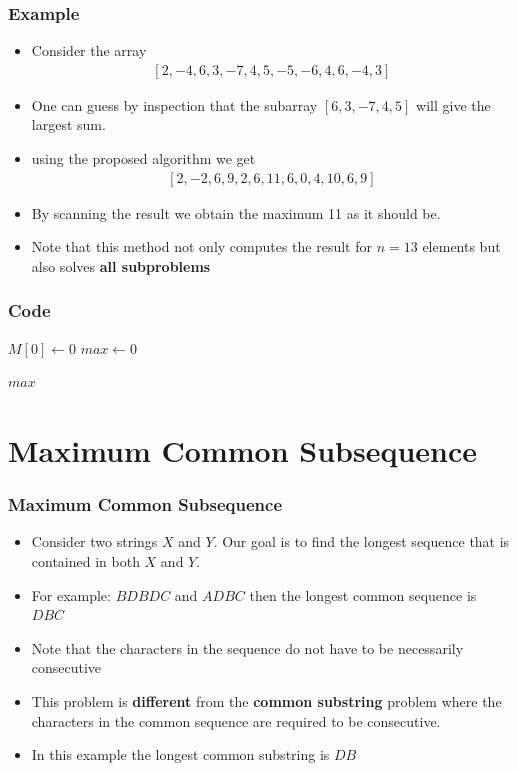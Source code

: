 \documentclass{beamer}
\begin{document}
\begin{frame}
  \frametitle{Example}
  \begin{itemize}
  \item Consider the array
    \begin{align*}
      \left[2,-4,6,3,-7,4,5,-5,-6,4,6,-4,3 \right]
    \end{align*}
\item One can guess by inspection that the subarray $\left[6,3,-7,4,5 \right]$ will give the largest sum.
\item using the proposed algorithm we get
  \begin{align*}
    \left[2,-2,6,9,2,6,11,6,0,4,10,6,9 \right]
  \end{align*}
\item By scanning the result we obtain the maximum 11 as it should be.
\item Note that this method not only computes the result for $n=13$ elements but also solves \textbf{all subproblems}
  \end{itemize}
\end{frame}

\begin{frame}
  \frametitle{Code}
\begin{algorithm}[H]
 
  \DontPrintSemicolon
  \BlankLine

$M[0]\gets 0$\;
$max\gets 0$\;

\Return $max$\;  
\end{algorithm}
    
\end{frame}

\section{Maximum Common Subsequence}
\begin{frame}
  \frametitle{Maximum Common Subsequence}
  \begin{itemize}
  \item Consider two strings $X$ and $Y$. Our goal is to find the longest sequence that is contained in both $X$ and $Y$.
  
  \item For example: $BDBDC$ and $ADBC$ then the longest common sequence is $DBC$
  \item Note that the characters in the sequence do not have to be necessarily consecutive
  \item This problem is \textbf{different} from the \textbf{common substring} problem where the characters in the common sequence are required to be consecutive.
  \item In this example the longest common substring is $DB$
  \end{itemize}
\end{frame}
\end{document}
